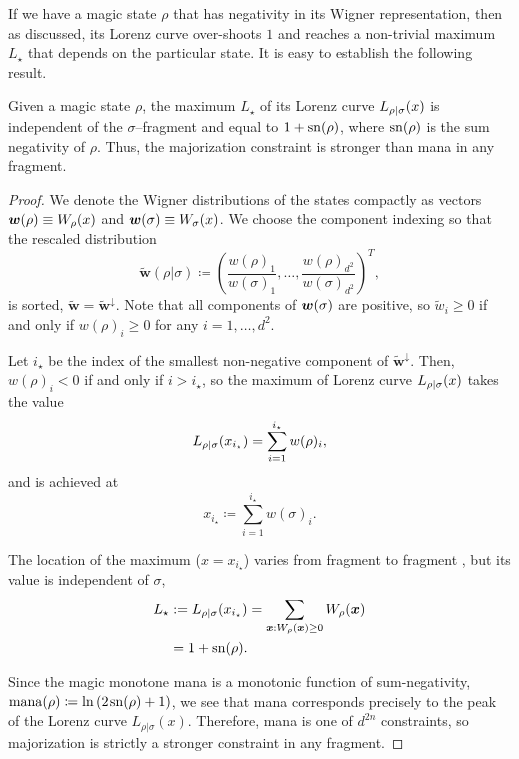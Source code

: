 \documentclass[pra,
aps,
twocolumn,
superscriptaddress,
groupedaddress,
nofootinbib,
reprint
]{revtex4-1}
\begin{document}
If we have a magic state $\rho$ that has negativity in its Wigner representation, then as discussed, its Lorenz curve over-shoots $1$ and reaches a non-trivial maximum $L_\star$ that depends on the particular state. It is easy to establish the following result.
\begin{lemma}\label{lem:lcmax}
	Given a magic state $\rho$, the maximum $L_\star$ of its Lorenz curve ${L_{\rho|\sigma}}(x)$ is independent of the $\sigma$--fragment and equal to $1+{{\rm{sn}}(\rho)}$, where $\rm{sn}(\rho)$ is the sum negativity of $\rho$. Thus, the majorization constraint is stronger than mana in any fragment.
\end{lemma}
\begin{proof}
	We denote the Wigner distributions of the states compactly as vectors $\bm{w}(\rho) \equiv W_\rho(x)$ and $\bm{w}(\sigma) \equiv W_\sigma(x)$.
	We choose the component indexing so that the rescaled distribution 
	\begin{equation}
		\widetilde{\bm{w}}(\rho|\sigma) \coloneqq \left(\frac{w(\rho)_1}{w(\sigma)_1}, \dots, \frac{w(\rho)_{d^2}}{w(\sigma)_{d^2}} \right)^T,
	\end{equation}
	is sorted, $\widetilde{\bm{w}} = \widetilde{\bm{w}}^\downarrow$.
	Note that all components of $\bm{w}(\sigma)$ are positive, so $\widetilde{w}_i \geq 0$ if and only if $w(\rho)_i \geq 0$ for any $i=1,\dots,d^2$.
	
	Let $i_\star$ be the index of the smallest non-negative component of $\widetilde{\bm{w}}^\downarrow$.
	Then, $w(\rho)_i < 0$ if and only if $i > i_\star$, so the maximum of Lorenz curve ${L_{\rho|\sigma}}(x)$ takes the value 
	\begin{equation}
		{L_{\rho|\sigma}}(x_{i_\star}) = \sum_{i=1}^{i_\star} w(\rho)_i,
	\end{equation}
	and is achieved at
	\begin{equation}\label{eq:maxloc}
		x_{i_\star} \coloneqq \sum_{i=1}^{i_\star} w(\sigma)_i.
	\end{equation}

	The location of the maximum ($x=x_{i_\star}$) varies from fragment to fragment , but its value is independent of $\sigma$,
	\begin{align}
	L_\star &:=	\lc{\rho}{\sigma}(x_{i_\star}) 
		= \sum\limits_{\bmx: \W[\bmx]{\rho} \geq 0} \W[\bmx]{\rho} \nonumber \\
		&= 1 + \sn{\rho}.
	\end{align}
	
Since the magic monotone mana is a monotonic function of sum-negativity, $\rm{mana}(\rho) \coloneqq \ln{(2\hspace{1pt} {{\rm{sn}}(\rho)} +1)}$, we see that mana corresponds precisely to the peak of the Lorenz curve $L_{\rho|\sigma}(x)$. Therefore, mana is one of $d^{2n}$ constraints, so majorization is strictly a stronger constraint in any fragment.
\end{proof}
\end{document}
